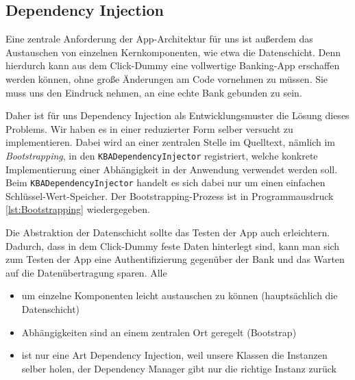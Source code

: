 \subsection{Dependency Injection}
	Eine zentrale Anforderung der App-Architektur für uns ist außerdem das Austauschen von einzelnen Kernkomponenten, wie etwa die Datenschicht. Denn hierdurch kann aus dem Click-Dummy eine vollwertige Banking-App erschaffen werden können, ohne große Änderungen am Code vornehmen zu müssen. Sie muss uns den Eindruck nehmen, an eine echte Bank gebunden zu sein.
	
	Daher ist für uns Dependency Injection als Entwicklungsmuster die Lösung dieses Problems. Wir haben es in einer reduzierter Form selber versucht zu implementieren. Dabei wird an einer zentralen Stelle im Quelltext, nämlich im \emph{Bootstrapping}, in den \texttt{KBADependencyInjector} registriert, welche konkrete Implementierung einer Abhängigkeit in der Anwendung verwendet werden soll. Beim \texttt{KBADependencyInjector} handelt es sich dabei nur um einen einfachen Schlüssel-Wert-Speicher. Der Bootstrapping-Prozess ist in Programmausdruck \ref{lst:Bootstrapping} wiedergegeben.
	
	
	
	Die Abstraktion der Datenschicht sollte das Testen der App auch erleichtern. Dadurch, dass in dem Click-Dummy feste Daten hinterlegt sind, kann man sich zum Testen der App eine Authentifizierung gegenüber der Bank und das Warten auf die Datenübertragung sparen. Alle 
	
\begin{itemize}
	\item um einzelne Komponenten leicht austauschen zu können (hauptsächlich die Datenschicht)
	\item Abhängigkeiten sind an einem zentralen Ort geregelt (Bootstrap)
	\item ist nur eine Art Dependency Injection, weil unsere Klassen die Instanzen selber holen, der Dependency Manager gibt nur die richtige Instanz zurück
\end{itemize}